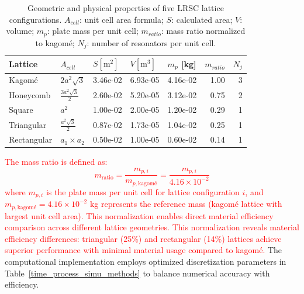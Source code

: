 \documentclass[review,numbers,sort&compress]{elsarticle}
\begin{document}
\begin{table}[htb]
	\centering
	\caption{Geometric and physical properties of five LRSC lattice configurations. $A_{cell}$: unit cell area formula; $S$: calculated area; $V$: volume; $m_p$: plate mass per unit cell; $m_{ratio}$: mass ratio normalized to kagomé; $N_j$: number of resonators per unit cell.}
	\label{unit_cell_five_lat_params}
	\begin{tabular}{lllllrr}
	\hline
	Lattice & $A_{cell}$ & $S\mathrm{[m^2]}$ & $V\mathrm{[m^3]}$ &  $m_p$ [kg] &  $m_{ratio}$ & $N_{j}$ \\
	\hline
		Kagomé      & $2a^2\sqrt{3}$           &     3.46e-02  	&    6.93e-05 	&     4.16e-02 	&    1.00  & 3  \\
		Honeycomb   & $\frac{3a^2\sqrt{3}}{2}$ &     2.60e-02   	&    5.20e-05  	&     3.12e-02 	&    0.75 & 2 	\\
		Square      & $a^2$                    &     1.00e-02    	&    2.00e-05   &     1.20e-02  &    0.29 & 1 	\\
		Triangular  & $\frac{a^2\sqrt{3}}{2}$  &     0.87e-02 		&    1.73e-05 	&     1.04e-02 	&    0.25 & 1 	\\
		Rectangular & $a_1 \times a_2$         &     0.50e-02   	&    1.00e-05   &     0.60e-02  &    0.14 & 1 	\\
		\hline
	\end{tabular}
\end{table}

\textcolor{red}{The mass ratio is defined as:
\begin{equation}
m_{\text{ratio}} = \frac{m_{p,i}}{m_{p,\text{kagomé}}} = \frac{m_{p,i}}{4.16 \times 10^{-2}}
\label{eq:mass_ratio}
\end{equation}
where $m_{p,i}$ is the plate mass per unit cell for lattice configuration $i$, and $m_{p,\text{kagomé}} = 4.16 \times 10^{-2}$ kg represents the reference mass (kagomé lattice with largest unit cell area). This normalization enables direct material efficiency comparison across different lattice geometries. This normalization reveals material efficiency differences: triangular (25\%) and rectangular (14\%) lattices achieve superior performance with minimal material usage compared to kagomé.} The computational implementation employs optimized discretization parameters in Table~\ref{time_process_simu_methods} to balance numerical accuracy with efficiency.
\end{document}

